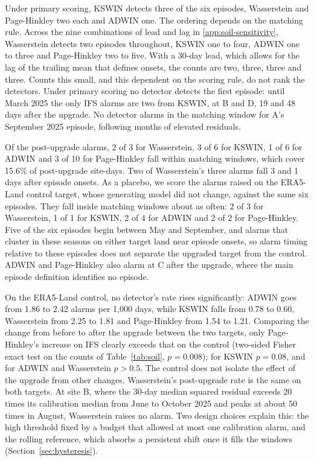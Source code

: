 \documentclass[preprint,12pt]{elsarticle}
\begin{document}
Under primary scoring, KSWIN detects three of the six episodes, Wasserstein and Page-Hinkley two each and ADWIN one. The ordering depends on the matching rule. Across the nine combinations of lead and lag in \ref{app:soil-sensitivity}, Wasserstein detects two episodes throughout, KSWIN one to four, ADWIN one to three and Page-Hinkley two to five. With a 30-day lead, which allows for the lag of the trailing mean that defines onsets, the counts are two, three, three and three. Counts this small, and this dependent on the scoring rule, do not rank the detectors. Under primary scoring no detector detects the first episode: until March 2025 the only IFS alarms are two from KSWIN, at B and D, 19 and 48 days after the upgrade. No detector alarms in the matching window for A's September 2025 episode, following months of elevated residuals.

Of the post-upgrade alarms, 2 of 3 for Wasserstein, 3 of 6 for KSWIN, 1 of 6 for ADWIN and 3 of 10 for Page-Hinkley fall within matching windows, which cover 15.6\% of post-upgrade site-days. Two of Wasserstein's three alarms fall 3 and 1 days after episode onsets. As a placebo, we score the alarms raised on the ERA5-Land control target, whose generating model did not change, against the same six episodes. They fall inside matching windows about as often: 2 of 3 for Wasserstein, 1 of 1 for KSWIN, 2 of 4 for ADWIN and 2 of 2 for Page-Hinkley. Five of the six episodes begin between May and September, and alarms that cluster in these seasons on either target land near episode onsets, so alarm timing relative to these episodes does not separate the upgraded target from the control. ADWIN and Page-Hinkley also alarm at C after the upgrade, where the main episode definition identifies no episode.

On the ERA5-Land control, no detector's rate rises significantly: ADWIN goes from 1.86 to 2.42 alarms per 1,000 days, while KSWIN falls from 0.78 to 0.60, Wasserstein from 2.25 to 1.81 and Page-Hinkley from 1.54 to 1.21. Comparing the change from before to after the upgrade between the two targets, only Page-Hinkley's increase on IFS clearly exceeds that on the control (two-sided Fisher exact test on the counts of Table~\ref{tab:soil}, $p=0.008$); for KSWIN $p=0.08$, and for ADWIN and Wasserstein $p>0.5$. The control does not isolate the effect of the upgrade from other changes. Wasserstein's post-upgrade rate is the same on both targets. At site B, where the 30-day median squared residual exceeds 20 times its calibration median from June to October 2025 and peaks at about 50 times in August, Wasserstein raises no alarm. Two design choices explain this: the high threshold fixed by a budget that allowed at most one calibration alarm, and the rolling reference, which absorbs a persistent shift once it fills the windows (Section~\ref{sec:hysteresis}).
\end{document}
